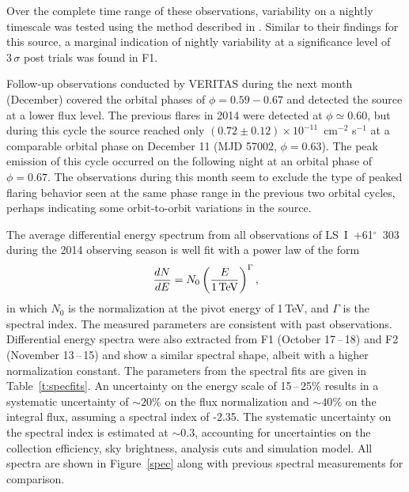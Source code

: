 \documentclass[preprint2]{aastex}
\newcommand{\tapp}{\raisebox{0.5ex}{\texttildelow}}
\newcommand{\pflux}{~cm$^{-2}$ s$^{-1}$}
\newcommand{\lsi}{LS~I~+61$^{\circ}$~303}
\newcommand{\tev}{\,TeV}
\begin{document}
Over the complete time range of these observations, variability on a nightly timescale was tested using the method described in \citet{2013ApJ...779...88A}. Similar to their findings for this source, a marginal indication of nightly variability at a significance level of \tapp{}$3\,\sigma$ post trials was found in F1.

Follow-up observations conducted by VERITAS during the next month (December) covered the orbital phases of $\phi=0.59-0.67$ and detected the source at a lower flux level. The previous flares in 2014 were detected at $\phi \simeq 0.60$, but during this cycle the source reached only $(0.72 \pm 0.12) \times10^{-11}$\pflux{} at a comparable orbital phase on December 11 (MJD 57002, $\phi=0.63$). The peak emission of this cycle occurred on the following night at an orbital phase of $\phi=0.67$. The observations during this month seem to exclude the type of peaked flaring behavior seen at the same phase range in the previous two orbital cycles, perhaps indicating some orbit-to-orbit variations in the source.


The average differential energy spectrum from all observations of \lsi{} during the 2014 observing season is well fit with a power law of the form
\begin{equation}
\frac{dN}{dE} = N_0 \left( \frac{E}{1\mbox{\tev{}}} \right)^{\Gamma},
\end{equation}
in which $N_0$ is the normalization at the pivot energy of 1\tev{}, and $\Gamma$ is the spectral index. The measured parameters are consistent with past observations. Differential energy spectra were also extracted from F1 (October 17\,--\,18) and F2 (November 13\,--\,15) and show a similar spectral shape, albeit with a higher normalization constant. The parameters from the spectral fits are given in Table~\ref{t:specfits}. An uncertainty on the energy scale of 15\,--\,25\% results in a systematic uncertainty of $\sim20\%$ on the flux normalization and $\sim40\%$ on the integral flux, assuming a spectral index of -2.35. The systematic uncertainty on the spectral index is estimated at $\sim 0.3$, accounting for uncertainties on the collection efficiency, sky brightness, analysis cuts and simulation model. All spectra are shown in Figure~\ref{spec} along with previous spectral measurements \citep{VERITASLSIDetection,Aleksic} for comparison.
\end{document}
